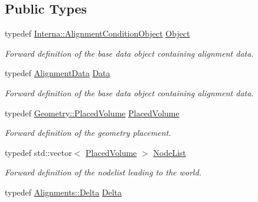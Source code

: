 \subsection*{Public Types}
\begin{DoxyCompactItemize}
\item 
typedef \hyperlink{class_d_d4hep_1_1_alignments_1_1_interna_1_1_alignment_condition_object}{Interna::AlignmentConditionObject} \hyperlink{class_d_d4hep_1_1_alignments_1_1_alignment_condition_aad9d743ab04b8eb38063249c6a9e16c0}{Object}
\begin{DoxyCompactList}\small\item\em Forward definition of the base data object containing alignment data. \item\end{DoxyCompactList}\item 
typedef \hyperlink{class_d_d4hep_1_1_alignments_1_1_alignment_data}{AlignmentData} \hyperlink{class_d_d4hep_1_1_alignments_1_1_alignment_condition_a6fcd9bd0e9ac67afcf43270cbd9e9983}{Data}
\begin{DoxyCompactList}\small\item\em Forward definition of the base data object containing alignment data. \item\end{DoxyCompactList}\item 
typedef \hyperlink{class_d_d4hep_1_1_geometry_1_1_placed_volume}{Geometry::PlacedVolume} \hyperlink{class_d_d4hep_1_1_alignments_1_1_alignment_condition_a4d73434f31bcdf1c29d271c14b9122cb}{PlacedVolume}
\begin{DoxyCompactList}\small\item\em Forward definition of the geometry placement. \item\end{DoxyCompactList}\item 
typedef std::vector$<$ \hyperlink{class_d_d4hep_1_1_geometry_1_1_placed_volume}{PlacedVolume} $>$ \hyperlink{class_d_d4hep_1_1_alignments_1_1_alignment_condition_ae1ff696352ce5e8726973ea89cf80d8a}{NodeList}
\begin{DoxyCompactList}\small\item\em Forward definition of the nodelist leading to the world. \item\end{DoxyCompactList}\item 
typedef \hyperlink{class_d_d4hep_1_1_alignments_1_1_delta}{Alignments::Delta} \hyperlink{class_d_d4hep_1_1_alignments_1_1_alignment_condition_a7a0f38a79212c07c444c8c8cd512bbd6}{Delta}

\end{DoxyCompactItemize}
